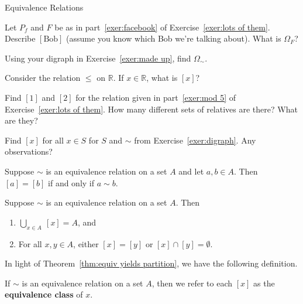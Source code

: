 \begin{section}{Equivalence Relations}
\begin{exercise}
Let $P_f$ and $F$ be as in part~\ref{exer:facebook} of Exercise~\ref{exer:lots of them}.  Describe $[\text{Bob}]$ (assume you know which Bob we're talking about).  What is $\Omega_F$?
\end{exercise}

\begin{exercise}
Using your digraph in Exercise~\ref{exer:made up}, find $\Omega_{\sim}$.  
\end{exercise}

\begin{exercise}
Consider the relation $\leq$ on $\mathbb{R}$.  If $x\in \mathbb{R}$, what is $[x]$?
\end{exercise}

\begin{exercise}\label{exer:mod5classes}
Find $[1]$ and $[2]$ for the relation given in part~\ref{exer:mod 5} of Exercise~\ref{exer:lots of them}.  How many different sets of relatives are there?  What are they?
\end{exercise}

\begin{exercise}
Find $[x]$ for all $x\in S$ for $S$ and $\sim$ from Exercise~\ref{exer:digraph}.  Any observations?
\end{exercise}

\begin{theorem}\label{thm:related if and only if same class}
Suppose $\sim$ is an equivalence relation on a set $A$ and let $a,b\in A$.  Then $[a]=[b]$ if and only if $a\sim b$.
\end{theorem}

\begin{theorem}\label{thm:equiv yields partition}
Suppose $\sim$ is an equivalence relation on a set $A$.  Then
\begin{enumerate}[label=\textrm{(\alph*)}]
\item $\displaystyle \bigcup_{x\in A}\ [x]=A$, and
\item For all $x,y\in A$, either $[x]=[y]$ or $[x]\cap [y]=\emptyset$.
\end{enumerate}
\end{theorem}

In light of Theorem~\ref{thm:equiv yields partition}, we have the following definition.

\begin{definition}\label{def:equivalence class}
If $\sim$ is an equivalence relation on a set $A$, then we refer to each $[x]$ as the \textbf{equivalence class} of $x$.
\end{definition}


\end{section}
